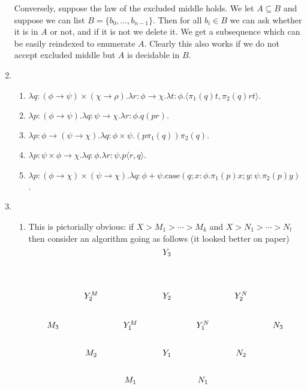 \documentclass{article}
\theoremstyle{plain}
\begin{document}
\begin{enumerate}
		Conversely, suppose the law of the excluded middle holds. We let $A\subseteq B$ and suppose we can list $B=\{b_0,\ldots,b_{n-1}\}$. Then for all $b_i\in B$ we can ask whether it is in $A$ or not, and if it is not we delete it. We get a subsequence which can be easily reindexed to enumerate $A$. Clearly this also works if we do not accept excluded middle but $A$ is decidable in $B$.
		\item 
		\begin{enumerate}
			\item $\lambda q \colon (\phi \to \psi) \times (\chi \to \rho). \lambda r \colon \phi \to \chi. \lambda t \colon \phi. \langle \pi_1(q)t,\pi_2(q)rt\rangle.$
			\item $\lambda p \colon (\phi \to \psi). \lambda q \colon \psi \to \chi. \lambda r \colon \phi. q(pr).$
			\item $\lambda p \colon \phi \to (\psi \to \chi). \lambda q\colon \phi \times \psi. (p\pi_1(q))\pi_2(q)$.
			\item $\lambda p \colon \psi \times \phi \to \chi. \lambda q \colon \phi. \lambda r \colon \psi. p\langle r,q\rangle$.
			\item $\lambda p \colon (\phi \to \chi) \times (\psi \to \chi). \lambda q\colon \phi + \psi. \text{case}(q;x\colon \phi. \pi_1(p)x;y\colon \psi. \pi_2(p)y)$.
		\end{enumerate}
		\item 
		\begin{enumerate}
			\item This is pictorially obvious: if $X > M_1 > \cdots > M_k$ and $X > N_1 > \cdots > N_l$ then consider an algorithm going as follows (it looked better on paper)
			\[\begin{tikzcd}[cramped]
				&&& {Y_3} \\
				\\
				& {Y_2^M} && {Y_2} && {Y^N_2} \\
				{M_3} && {Y_1^M} && {Y_1^N} && {N_3} \\
				& {M_2} && {Y_1} && {N_2} \\
				&& {M_1} && {N_1} \\

\end{tikzcd}\]
\end{enumerate}
\end{enumerate}
\end{document}
